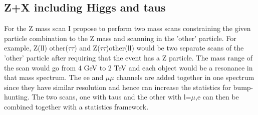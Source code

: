\documentclass[11pt]{article}
\newcommand{\too}{$\rightarrow$}
\begin{document}

\subsection{Z+X including Higgs and taus}




For the Z mass scan I propose to perform two mass scans constraining the given particle combination to the Z mass and scanning in the 'other' particle. 
For example, Z(ll) other($\tau\tau$) and Z($\tau\tau$)other(ll) would be two separate scans of the 'other' particle after requiring that the event has a Z particle. 
The mass range of the scan would go from 4 GeV to 2 TeV and each object would be a resonance in that mass spectrum. The ee and $\mu\mu$ channels are added together 
in one spectrum since they have similar resolution and hence can increase the statistics for bump-hunting.  
The two scans, one with taus and the other with l=$\mu$,e  can then be combined together with a statistics framework.  
\end{document}
